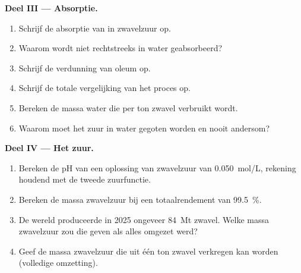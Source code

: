 \begin{problem}
\medskip
\noindent\textbf{Deel III --- Absorptie.}
\begin{enumerate}[resume]
  \item Schrijf de absorptie van  in zwavelzuur op.
  \item Waarom wordt  niet rechtstreeks in water geabsorbeerd?
  \item Schrijf de verdunning van oleum op.
  \item Schrijf de totale vergelijking van het proces op.
  \item Bereken de massa water die per ton zwavel verbruikt wordt.
  \item Waarom moet het zuur in water gegoten worden en nooit andersom?
\end{enumerate}

\medskip
\noindent\textbf{Deel IV --- Het zuur.}
\begin{enumerate}[resume]
  \item Bereken de pH van een oplossing van zwavelzuur van
        \qty{0.050}{mol/L}, rekening houdend met de tweede zuurfunctie.
  \item Bereken de massa zwavelzuur bij een totaalrendement van
        \qty{99.5}{\percent}.
  \item De wereld produceerde in 2025 ongeveer \qty{84}{Mt} zwavel.
        Welke massa zwavelzuur zou die geven als alles omgezet werd?
  \item Geef de massa zwavelzuur die uit één ton zwavel verkregen kan
        worden (volledige omzetting).
\end{enumerate}
\end{problem}
